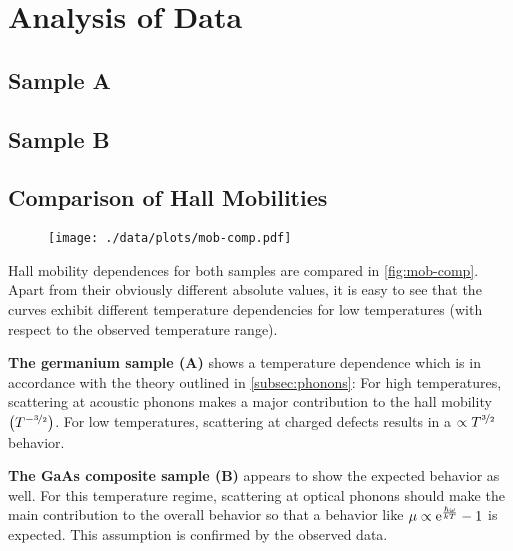\chapter{Analysis of Data}

\section{Sample A}

\section{Sample B}

\section{Comparison of Hall Mobilities}
\begin{figure}
  \centering
  \texttt{[image: ./data/plots/mob-comp.pdf]}
  \label{fig:mob-comp}
\end{figure}

Hall mobility dependences for both samples are compared in \autoref{fig:mob-comp}.
Apart from their obviously different absolute values, it is easy to see that the curves exhibit different temperature dependencies for low temperatures (with respect to the observed temperature range).

\textbf{The germanium sample (A)} shows a temperature dependence which is in accordance with the theory outlined in \autoref{subsec:phonons}: For high temperatures, scattering at acoustic phonons makes a major contribution to the hall mobility $\left(T^{-\nicefrac{3}{2}}\right)$.
For low temperatures, scattering at charged defects results in a $\propto T^{\nicefrac{3}{2}}$ behavior.

\textbf{The GaAs composite sample (B)} appears to show the expected behavior as well.
For this temperature regime, scattering at optical phonons should make the main contribution to the overall behavior so that a behavior like $\mu\propto \mathrm{e}^\frac{\hbar \omega}{k T} - 1$ is expected.
This assumption is confirmed by the observed data.
